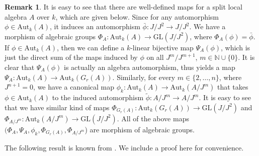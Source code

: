 \documentclass[12pt]{amsart}
\theoremstyle{definition}
\newtheorem{remark}[theorem]{Remark}
\numberwithin{equation}{section}
\begin{document}
\vskip2mm
\begin{remark}\label{Remark 4.11}
It is easy to see that there are well-defined maps for a split local algebra $A$ over $k$, which are given below. Since for any automorphism $\phi\in \mathrm{Aut}_{k}(A)$, it induces an automorphism $\bar{\phi}:J/J^2\rightarrow J/J^2$. We have a morphism of algebraic groups $\Phi_A: \mathrm{Aut}_{k}(A)\rightarrow \mathrm{GL}(J/J^2)$, where $\Phi_A(\phi)=\bar{\phi}$. If $\phi\in \mathrm{Aut}_{k}(A)$, then we can define a $k$-linear bijective map $\Psi_A(\phi)$, which is just the direct sum of the maps induced by $\phi$ on all $J^m/J^{m+1}$, $m\in \mathbb{N}\cup \{0\}$. It is clear that $\Psi_A(\phi)$ is actually an algebra automorphism, thus yields a map $\Psi_A:\mathrm{Aut}_{k}(A)\rightarrow \mathrm{Aut}_{k}(G_{r}(A))$. Similarly, for every $m\in\{2,\dots,n\}$, where $J^{n+1}=0$, we have a canonical map $\phi_{k}: \mathrm{Aut}_{k}(A)\rightarrow \mathrm{Aut}_{k}(A/J^m)$ that takes $\phi\in \mathrm{Aut}_{k}(A)$ to the induced automorphism $\tilde{\phi}: A/J^m\rightarrow A/J^m$.  It is easy to see that we have similar kind of maps $\Phi_{G_{r}(A)}: \mathrm{Aut}_{k}(G_{r}(A))\rightarrow \mathrm{GL}(J/J^2)$ and $\Phi_{A/J^{m}}:\mathrm{Aut}_{k}(A/J^m)\rightarrow \mathrm{GL}(J/J^2)$.  All of the above maps $(\Phi_A, \Psi_A, \phi_{k},\Phi_{G_{r}(A)}, \Phi_{A/J^m}$) are morphism of algebraic groups.
\end{remark}
\vskip2mm
\noindent
The following result is known from \cite{Pollack}. We include a proof here for convenience.
\end{document}
